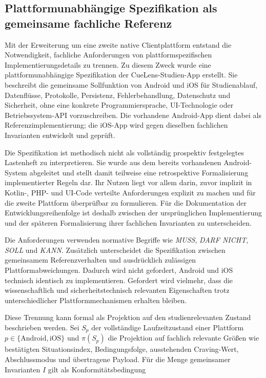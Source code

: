 
\begin{neu}
\section{Plattformunabhängige Spezifikation als gemeinsame fachliche Referenz}

Mit der Erweiterung um eine zweite native Clientplattform entstand die Notwendigkeit, fachliche Anforderungen von plattformspezifischen Implementierungsdetails zu trennen. Zu diesem Zweck wurde eine plattformunabhängige Spezifikation der CueLens-Studien-App erstellt. Sie beschreibt die gemeinsame Sollfunktion von Android und iOS für Studienablauf, Datenflüsse, Protokolle, Persistenz, Fehlerbehandlung, Datenschutz und Sicherheit, ohne eine konkrete Programmiersprache, UI-Technologie oder Betriebssystem-API vorzuschreiben. Die vorhandene Android-App dient dabei als Referenzimplementierung; die iOS-App wird gegen dieselben fachlichen Invarianten entwickelt und geprüft.

Die Spezifikation ist methodisch nicht als vollständig prospektiv festgelegtes Lastenheft zu interpretieren. Sie wurde aus dem bereits vorhandenen Android-System abgeleitet und stellt damit teilweise eine retrospektive Formalisierung implementierter Regeln dar. Ihr Nutzen liegt vor allem darin, zuvor implizit in Kotlin-, PHP- und UI-Code verteilte Anforderungen explizit zu machen und für die zweite Plattform überprüfbar zu formulieren. Für die Dokumentation der Entwicklungsreihenfolge ist deshalb zwischen der ursprünglichen Implementierung und der späteren Formalisierung ihrer fachlichen Invarianten zu unterscheiden.

Die Anforderungen verwenden normative Begriffe wie \emph{MUSS}, \emph{DARF NICHT}, \emph{SOLL} und \emph{KANN}. Zusätzlich unterscheidet die Spezifikation zwischen gemeinsamem Referenzverhalten und ausdrücklich zulässigen Plattformabweichungen. Dadurch wird nicht gefordert, Android und iOS technisch identisch zu implementieren. Gefordert wird vielmehr, dass die wissenschaftlich und sicherheitstechnisch relevanten Eigenschaften trotz unterschiedlicher Plattformmechanismen erhalten bleiben.

Diese Trennung kann formal als Projektion auf den studienrelevanten Zustand beschrieben werden. Sei \(S_p\) der vollständige Laufzeitzustand einer Plattform \(p\in\{\mathrm{Android},\mathrm{iOS}\}\) und \(\pi(S_p)\) die Projektion auf fachlich relevante Größen wie bestätigten Situationsindex, Bedingungsfolge, ausstehenden Craving-Wert, Abschlussmodus und übertragene Payload. Für die Menge gemeinsamer Invarianten \(I\) gilt als Konformitätsbedingung


\end{neu}
